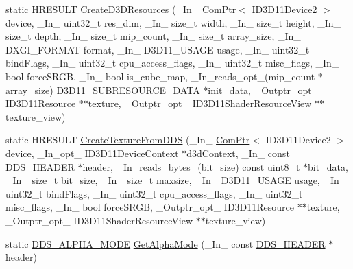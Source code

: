 \begin{DoxyCompactItemize}
\item 
static H\+R\+E\+S\+U\+LT \hyperlink{namespacemage_a47717f8390dbceacee1fbbd98ccf20ec}{Create\+D3\+D\+Resources} (\+\_\+\+In\+\_\+ \hyperlink{namespacemage_ae74f374780900893caa5555d1031fd79}{Com\+Ptr}$<$ I\+D3\+D11\+Device2 $>$ device, \+\_\+\+In\+\_\+ uint32\+\_\+t res\+\_\+dim, \+\_\+\+In\+\_\+ size\+\_\+t width, \+\_\+\+In\+\_\+ size\+\_\+t height, \+\_\+\+In\+\_\+ size\+\_\+t depth, \+\_\+\+In\+\_\+ size\+\_\+t mip\+\_\+count, \+\_\+\+In\+\_\+ size\+\_\+t array\+\_\+size, \+\_\+\+In\+\_\+ D\+X\+G\+I\+\_\+\+F\+O\+R\+M\+AT format, \+\_\+\+In\+\_\+ D3\+D11\+\_\+\+U\+S\+A\+GE usage, \+\_\+\+In\+\_\+ uint32\+\_\+t bind\+Flags, \+\_\+\+In\+\_\+ uint32\+\_\+t cpu\+\_\+access\+\_\+flags, \+\_\+\+In\+\_\+ uint32\+\_\+t misc\+\_\+flags, \+\_\+\+In\+\_\+ bool force\+S\+R\+GB, \+\_\+\+In\+\_\+ bool is\+\_\+cube\+\_\+map, \+\_\+\+In\+\_\+reads\+\_\+opt\+\_\+(mip\+\_\+count $\ast$array\+\_\+size) D3\+D11\+\_\+\+S\+U\+B\+R\+E\+S\+O\+U\+R\+C\+E\+\_\+\+D\+A\+TA $\ast$init\+\_\+data, \+\_\+\+Outptr\+\_\+opt\+\_\+ I\+D3\+D11\+Resource $\ast$$\ast$texture, \+\_\+\+Outptr\+\_\+opt\+\_\+ I\+D3\+D11\+Shader\+Resource\+View $\ast$$\ast$texture\+\_\+view)
\item 
static H\+R\+E\+S\+U\+LT \hyperlink{namespacemage_a84aaf5ce730cb63cb50fac23aeb3d4a4}{Create\+Texture\+From\+D\+DS} (\+\_\+\+In\+\_\+ \hyperlink{namespacemage_ae74f374780900893caa5555d1031fd79}{Com\+Ptr}$<$ I\+D3\+D11\+Device2 $>$ device, \+\_\+\+In\+\_\+opt\+\_\+ I\+D3\+D11\+Device\+Context $\ast$d3d\+Context, \+\_\+\+In\+\_\+ const \hyperlink{structmage_1_1_d_d_s___h_e_a_d_e_r}{D\+D\+S\+\_\+\+H\+E\+A\+D\+ER} $\ast$header, \+\_\+\+In\+\_\+reads\+\_\+bytes\+\_\+(bit\+\_\+size) const uint8\+\_\+t $\ast$bit\+\_\+data, \+\_\+\+In\+\_\+ size\+\_\+t bit\+\_\+size, \+\_\+\+In\+\_\+ size\+\_\+t maxsize, \+\_\+\+In\+\_\+ D3\+D11\+\_\+\+U\+S\+A\+GE usage, \+\_\+\+In\+\_\+ uint32\+\_\+t bind\+Flags, \+\_\+\+In\+\_\+ uint32\+\_\+t cpu\+\_\+access\+\_\+flags, \+\_\+\+In\+\_\+ uint32\+\_\+t misc\+\_\+flags, \+\_\+\+In\+\_\+ bool force\+S\+R\+GB, \+\_\+\+Outptr\+\_\+opt\+\_\+ I\+D3\+D11\+Resource $\ast$$\ast$texture, \+\_\+\+Outptr\+\_\+opt\+\_\+ I\+D3\+D11\+Shader\+Resource\+View $\ast$$\ast$texture\+\_\+view)
\item 
static \hyperlink{namespacemage_a0c586a2bad862f4858900ca121ca80c2}{D\+D\+S\+\_\+\+A\+L\+P\+H\+A\+\_\+\+M\+O\+DE} \hyperlink{namespacemage_afcc0891e1660f8457696cb30f4ee518a}{Get\+Alpha\+Mode} (\+\_\+\+In\+\_\+ const \hyperlink{structmage_1_1_d_d_s___h_e_a_d_e_r}{D\+D\+S\+\_\+\+H\+E\+A\+D\+ER} $\ast$header)

\end{DoxyCompactItemize}

